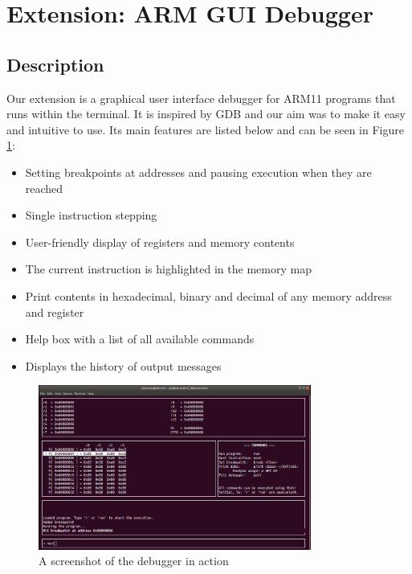 \documentclass[11pt]{article}
\begin{document}
\section{Extension: ARM GUI Debugger}
\subsection{Description}
Our extension is a graphical user interface debugger for ARM11 programs that runs within the terminal. It is inspired by GDB and our aim was to make it easy and intuitive to use. Its main features are listed below and can be seen in Figure \ref{fig:debugger}:

\begin{itemize}
    \item Setting breakpoints at addresses and pausing execution when they are reached
    \item Single instruction stepping
    \item User-friendly display of registers and memory contents
    \item The current instruction is highlighted in the memory map
    \item Print contents in hexadecimal, binary and decimal of any memory address and register
    \item Help box with a list of all available commands
    \item Displays the history of output messages
\end{itemize}

\begin{figure}
    \centering
    \includegraphics[width=0.8\textwidth]{debugger}
    \caption{A screenshot of the debugger in action}
    \label{fig:debugger}
\end{figure}
\end{document}
